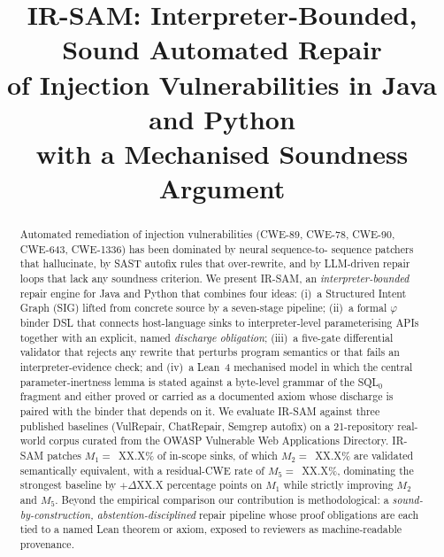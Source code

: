 \documentclass[conference]{IEEEtran}
\newcommand{\IRSAM}{\textsc{IR-SAM}}
\newcommand{\phisig}{\ensuremath{\varphi}}
\begin{document}
\title{IR-SAM: Interpreter-Bounded, Sound Automated Repair\\of Injection
Vulnerabilities in Java and Python\\with a Mechanised Soundness Argument}

\author{
}

\maketitle

\begin{abstract}
Automated remediation of injection vulnerabilities (CWE-89, CWE-78,
CWE-90, CWE-643, CWE-1336) has been dominated by neural sequence-to-
sequence patchers that hallucinate, by SAST autofix rules that
over-rewrite, and by LLM-driven repair loops that lack any soundness
criterion. We present \IRSAM, an \emph{interpreter-bounded} repair
engine for Java and Python that combines four ideas:
(i)~a Structured Intent Graph (SIG) lifted from concrete source by a
seven-stage pipeline; (ii)~a formal $\phisig$ binder DSL that connects
host-language sinks to interpreter-level parameterising APIs together
with an explicit, named \emph{discharge obligation};
(iii)~a five-gate differential validator that rejects any rewrite that
perturbs program semantics or that fails an interpreter-evidence
check; and (iv)~a Lean~4 mechanised model in which the central
parameter-inertness lemma is stated against a byte-level grammar of
the SQL${}_0$ fragment and either proved or carried as a documented
axiom whose discharge is paired with the binder that depends on it.
We evaluate \IRSAM{} against three published baselines (VulRepair,
ChatRepair, Semgrep autofix) on a 21-repository real-world corpus
curated from the OWASP Vulnerable Web Applications Directory.
\IRSAM{} patches $M_1 = $~XX.X\% of in-scope sinks, of which
$M_2 = $~XX.X\% are validated semantically equivalent, with a
residual-CWE rate of $M_5 = $~XX.X\%, dominating the strongest
baseline by $+\Delta$XX.X percentage points on $M_1$ while strictly
improving $M_2$ and $M_5$. Beyond the empirical comparison our
contribution is methodological: a \emph{sound-by-construction,
abstention-disciplined} repair pipeline whose proof obligations are
each tied to a named Lean theorem or axiom, exposed to reviewers as
machine-readable provenance.
\end{abstract}
\end{document}
